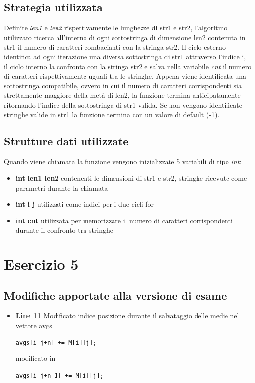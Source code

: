 \documentclass[11pt, a4paper, titlepage]{article}
\newcommand{\code}[1]{\colorbox{light-gray}{\texttt{#1}}}
\begin{document}
        \subsection{Strategia utilizzata}
            Definite \emph{len1} e \emph{len2} rispettivamente le lunghezze di str1 e str2, l'algoritmo 
            utilizzato ricerca all'interno di ogni sottostringa di dimensione len2 contenuta in str1 il numero
            di caratteri combacianti con la stringa str2. Il ciclo esterno identifica ad ogni iterazione una diversa 
            sottostringa di str1 attraverso l'indice i, il ciclo interno la confronta con la stringa str2 e salva nella
            variabile \emph{cnt} il numero di caratteri rispettivamente uguali tra le stringhe.
            Appena viene identificata una sottostringa compatibile, ovvero in cui il numero di caratteri corrispondenti
            sia strettamente maggiore della metà di len2, la funzione termina anticipatamente ritornando l'indice della
            sottostringa di str1 valida. Se non vengono identificate stringhe valide in str1 la funzione termina con un
            valore di default (-1).

        \subsection{Strutture dati utilizzate}
            Quando viene chiamata la funzione vengono inizializzate 5 variabili di tipo \emph{int}:
            \begin{itemize}
                \item \textbf{int len1 len2} contenenti le dimensioni di str1 e str2, stringhe ricevute come parametri
                durante la chiamata
                \item \textbf{int i j} utilizzati come indici per i due cicli for
                \item \textbf{int cnt} utilizzata per memorizzare il numero di caratteri corrispondenti durante il confronto
                tra stringhe

            \end{itemize}

    \section{Esercizio 5}

        \subsection{Modifiche apportate alla versione di esame}
            \begin{itemize}
                \item \textbf{Line 11} Modificato indice posizione durante il salvataggio delle medie nel vettore avgs
                
                    \code{avgs[i-j+n] += M[i][j];}

                    modificato in

                    \code{avgs[i-j+n-1] += M[i][j];}
            \end{itemize}
\end{document}
